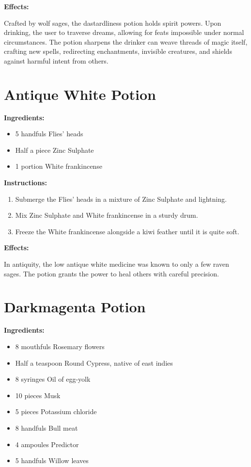 \documentclass{article}
\begin{document}
\textbf{Effects:}

Crafted by wolf sages, the dastardliness potion holds spirit powers. Upon drinking, the user to traverse dreams, allowing for feats impossible under normal circumstances. The potion sharpens the drinker can weave threads of magic itself, crafting new spells, redirecting enchantments, invisible creatures, and shields against harmful intent from others.

\newpage
\section*{Antique White Potion}

\textbf{Ingredients:}

\begin{itemize}
  \item 5 handfuls Flies' heads
  \item Half a piece Zinc Sulphate
  \item 1 portion White frankincense
\end{itemize}

\textbf{Instructions:}

\begin{enumerate}
  \item Submerge the Flies' heads in a mixture of Zinc Sulphate and lightning.
  \item Mix Zinc Sulphate and White frankincense in a sturdy drum.
  \item Freeze the White frankincense alongside a kiwi feather until it is quite soft.
\end{enumerate}

\textbf{Effects:}

In antiquity, the low antique white medicine was known to only a few raven sages. The potion grants the power to heal others with careful precision.

\newpage
\section*{Darkmagenta Potion}

\textbf{Ingredients:}

\begin{itemize}
  \item 8 mouthfuls Rosemary flowers
  \item Half a teaspoon Round Cypress, native of east indies
  \item 8 syringes Oil of egg-yolk
  \item 10 pieces Musk
  \item 5 pieces Potassium chloride
  \item 8 handfuls Bull meat
  \item 4 ampoules Predictor
  \item 5 handfuls Willow leaves
\end{itemize}
\end{document}
